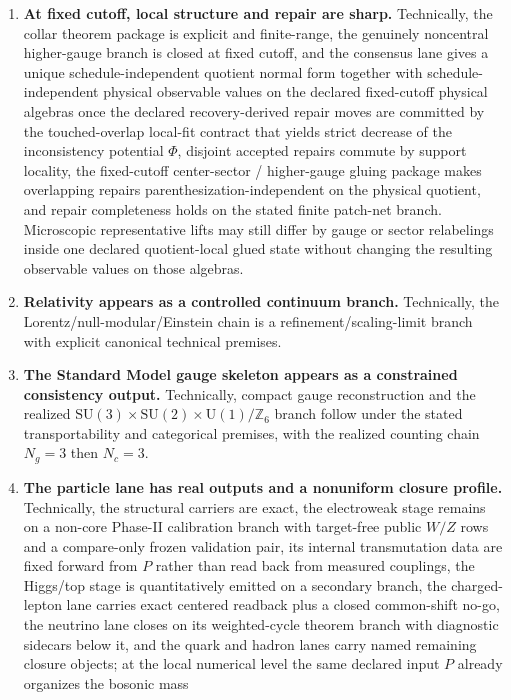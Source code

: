 \documentclass[11pt]{article}
\newcommand{\SU}{\mathrm{SU}}
\newcommand{\U}{\mathrm{U}}
\begin{document}
\begin{enumerate}[leftmargin=2em]
\item \textbf{At fixed cutoff, local structure and repair are sharp.} Technically, the
collar theorem package is explicit and finite-range, the genuinely noncentral higher-gauge branch
is closed at fixed cutoff, and the consensus lane gives a unique schedule-independent quotient
normal form together with schedule-independent physical observable values on the declared
fixed-cutoff physical algebras once the declared recovery-derived repair moves are committed by the
touched-overlap local-fit contract that yields strict decrease of the inconsistency potential
\(\Phi\), disjoint accepted repairs commute by support locality, the fixed-cutoff center-sector /
higher-gauge gluing package makes overlapping repairs parenthesization-independent on the physical
quotient, and repair completeness holds on the stated finite patch-net branch. Microscopic
representative lifts may still differ by gauge or sector relabelings inside one declared
quotient-local glued state without changing the resulting observable values on those algebras.
\item \textbf{Relativity appears as a controlled continuum branch.}
Technically, the Lorentz/null-modular/Einstein chain is a refinement/scaling-limit branch with
explicit canonical technical premises.
\item \textbf{The Standard Model gauge skeleton appears as a constrained consistency output.}
Technically, compact gauge reconstruction and the realized
\(\SU(3)\times\SU(2)\times\U(1)/\mathbb Z_6\) branch follow under the stated transportability and
categorical premises, with the realized counting chain \(N_g=3\) then \(N_c=3\).
\item \textbf{The particle lane has real outputs and a nonuniform closure profile.}
Technically, the structural carriers are exact, the electroweak stage remains on a non-core
Phase-II calibration branch with target-free public \(W/Z\) rows and a compare-only frozen
validation pair, its internal transmutation data are fixed forward from \(P\) rather than read
back from measured couplings, the Higgs/top stage is quantitatively emitted on a secondary branch,
the charged-lepton lane carries exact centered readback plus a closed common-shift no-go, the
neutrino lane closes on its weighted-cycle theorem branch with diagnostic sidecars below it, and the
quark and hadron lanes carry named remaining closure objects;
at the local numerical level the same declared input \(P\) already organizes the bosonic mass

\end{enumerate}
\end{document}
